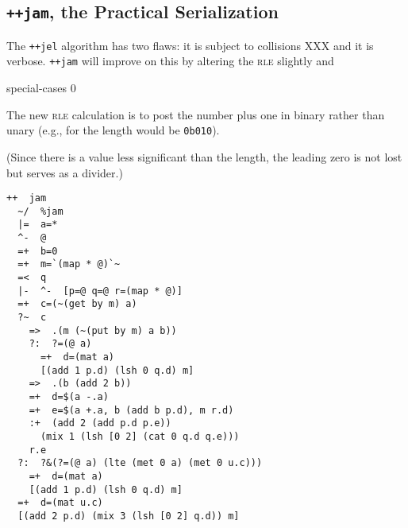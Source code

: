 \documentclass[twoside]{article}
\begin{document}
\subsection{\texttt{++jam}, the Practical Serialization}

The \texttt{++jel} algorithm has two flaws:  it is subject to collisions XXX
and it is verbose.  \texttt{++jam} will improve on this by altering the \textsc{rle} slightly and

special-cases 0

The new \textsc{rle} calculation is to post the number plus one in binary rather than unary (e.g., for \texttt{} the length would be \texttt{0b010}).

(Since there is a value less significant than the length, the leading zero is not lost but serves as a divider.)

\begin{lstlisting}[style=listingcode]
++  jam
  ~/  %jam
  |=  a=*
  ^-  @
  =+  b=0
  =+  m=`(map * @)`~
  =<  q
  |-  ^-  [p=@ q=@ r=(map * @)]
  =+  c=(~(get by m) a)
  ?~  c
    =>  .(m (~(put by m) a b))
    ?:  ?=(@ a)
      =+  d=(mat a)
      [(add 1 p.d) (lsh 0 q.d) m]
    =>  .(b (add 2 b))
    =+  d=$(a -.a)
    =+  e=$(a +.a, b (add b p.d), m r.d)
    :+  (add 2 (add p.d p.e))
      (mix 1 (lsh [0 2] (cat 0 q.d q.e)))
    r.e
  ?:  ?&(?=(@ a) (lte (met 0 a) (met 0 u.c)))
    =+  d=(mat a)
    [(add 1 p.d) (lsh 0 q.d) m]
  =+  d=(mat u.c)
  [(add 2 p.d) (mix 3 (lsh [0 2] q.d)) m]
\end{lstlisting}
\end{document}
